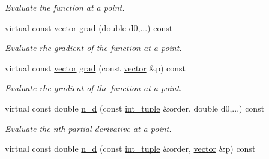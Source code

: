 \begin{DoxyCompactItemize}
\begin{DoxyCompactList}\small\item\em Evaluate the function at a point. \end{DoxyCompactList}\item 
\mbox{\label{classsisl_1_1test_1_1test__window_abb226d987d3d8d53f328ec15e6b560e3}} 
virtual const \hyperlink{namespacesisl_a2069bd5374a9be042ff3ce3306d41e1a}{vector} \hyperlink{classsisl_1_1test_1_1test__window_abb226d987d3d8d53f328ec15e6b560e3}{grad} (double d0,...) const
\begin{DoxyCompactList}\small\item\em Evaluate rhe gradient of the function at a point. \end{DoxyCompactList}\item 
\mbox{\label{classsisl_1_1test_1_1test__window_a6d0908757e3cb0a0f5d011c0f01ca264}} 
virtual const \hyperlink{namespacesisl_a2069bd5374a9be042ff3ce3306d41e1a}{vector} \hyperlink{classsisl_1_1test_1_1test__window_a6d0908757e3cb0a0f5d011c0f01ca264}{grad} (const \hyperlink{namespacesisl_a2069bd5374a9be042ff3ce3306d41e1a}{vector} \&p) const
\begin{DoxyCompactList}\small\item\em Evaluate rhe gradient of the function at a point. \end{DoxyCompactList}\item 
\mbox{\label{classsisl_1_1test_1_1test__window_a7ee40947015eff3a13ddac0ad3a6ef57}} 
virtual const double \hyperlink{classsisl_1_1test_1_1test__window_a7ee40947015eff3a13ddac0ad3a6ef57}{n\+\_\+d} (const \hyperlink{namespacesisl_adc492e1c166a136d08b283394d81cd71}{int\+\_\+tuple} \&order, double d0,...) const
\begin{DoxyCompactList}\small\item\em Evaluate the n\textquotesingle{}th partial derivative at a point. \end{DoxyCompactList}\item 
\mbox{\label{classsisl_1_1test_1_1test__window_a3240f71ac75869ad92882b4835f4fbe5}} 
virtual const double \hyperlink{classsisl_1_1test_1_1test__window_a3240f71ac75869ad92882b4835f4fbe5}{n\+\_\+d} (const \hyperlink{namespacesisl_adc492e1c166a136d08b283394d81cd71}{int\+\_\+tuple} \&order, \hyperlink{namespacesisl_a2069bd5374a9be042ff3ce3306d41e1a}{vector} \&p) const

\end{DoxyCompactItemize}
